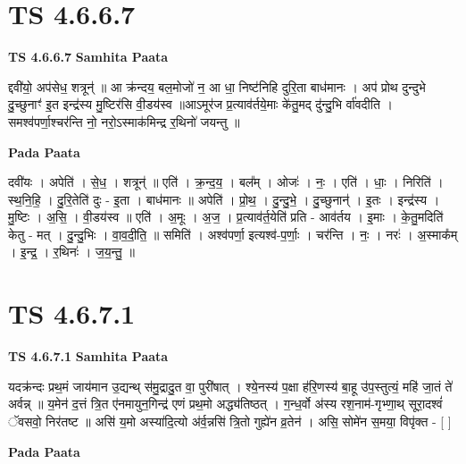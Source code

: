 \documentclass[17pt]{extarticle}
\begin{document}
\section*{ TS 4.6.6.7 }

\textbf{TS 4.6.6.7 } \newline
\textbf{Samhita Paata} \newline

द्दवी॑यो॒ अप॑सेध॒ शत्रून्॑ ॥ आ क्र॑न्दय॒ बल॒मोजो॑ न॒ आ धा॒ निष्ट॑निहि दुरि॒ता बाध॑मानः । अप॑ प्रोथ दुन्दुभे दु॒च्छुनाꣳ॑ इ॒त इन्द्र॑स्य मु॒ष्टिर॑सि वी॒डय॑स्व ॥आऽमूर॑ज प्र॒त्याव॑र्तये॒माः के॑तु॒मद् दु॑न्दु॒भि र्वा॑वदीति । समश्व॑पर्णा॒श्चर॑न्ति नो॒ नरो॒ऽस्माक॑मिन्द्र र॒थिनो॑ जयन्तु ॥ \newline

\textbf{Pada Paata} \newline

दवी॑यः । अपेति॑ । से॒ध॒ । शत्रून्॑ ॥ एति॑ । क्र॒न्द॒य॒ । बल᳚म् । ओजः॑ । नः॒ । एति॑ । धाः॒ । निरिति॑ । स्थ॒नि॒हि॒ । दु॒रि॒तेति॑ दुः - इ॒ता । बाध॑मानः ॥ अपेति॑ । प्रो॒थ॒ । दु॒न्दु॒भे॒ । दु॒च्छुनान्॑ । इ॒तः । इन्द्र॑स्य । मु॒ष्टिः । अ॒सि॒ । वी॒डय॑स्व ॥ एति॑ । अ॒मूः । अ॒ज॒ । प्र॒त्याव॑र्त॒येति॑ प्रति - आव॑र्तय । इ॒माः । के॒तु॒मदिति॑ केतु - मत् । दु॒न्दु॒भिः । वा॒व॒दी॒ति॒ ॥ समिति॑ । अश्व॑पर्णा॒ इत्यश्व॑-प॒र्णाः॒ । चर॑न्ति । नः॒ । नरः॑ । अ॒स्माक᳚म् । इ॒न्द्र॒ । र॒थिनः॑ । ज॒य॒न्तु॒ ॥  \newline




\section*{ TS 4.6.7.1 }

\textbf{TS 4.6.7.1 } \newline
\textbf{Samhita Paata} \newline

यदक्र॑न्दः प्रथ॒मं जाय॑मान उ॒द्यन्थ् स॑मु॒द्रादु॒त वा॒ पुरी॑षात् । श्ये॒नस्य॑ प॒क्षा ह॑रि॒णस्य॑ बा॒हू उ॑प॒स्तुत्यं॒ महि॑ जा॒तं ते॑ अर्वन्न् ॥ य॒मेन॑ द॒त्तं त्रि॒त ए॑नमायुन॒गिन्द्र॑ एणं प्रथ॒मो अद्ध्य॑तिष्ठत् । ग॒न्ध॒र्वो अ॑स्य रश॒नाम॑-गृभ्णा॒थ् सूरा॒दश्वं॑ ॅवसवो॒ निर॑तष्ट ॥ असि॑ य॒मो अस्या॑दि॒त्यो अ॑र्व॒न्नसि॑ त्रि॒तो गुह्ये॑न व्र॒तेन॑ । असि॒ सोमे॑न स॒मया॒ विपृ॑क्त - [  ] \newline

\textbf{Pada Paata} \newline
\end{document}
